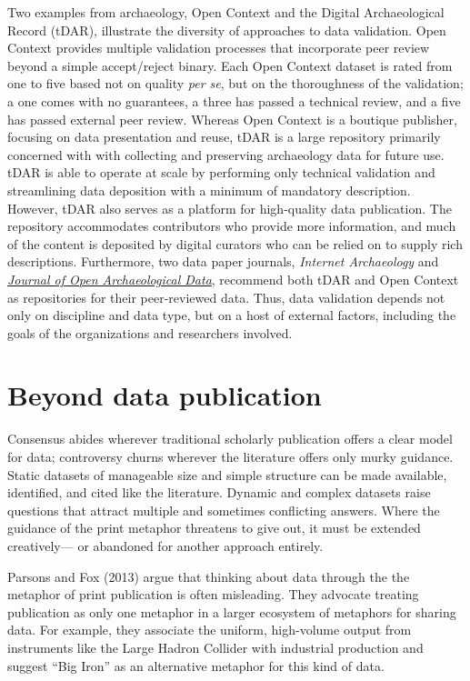 \documentclass[10pt,a4paper,twocolumn]{article}
\begin{document}
{{Two examples from archaeology, Open Context and the Digital Archaeological Record (tDAR), illustrate the diversity of approaches to data validation.
Open Context provides multiple validation processes that incorporate peer review beyond a simple accept/reject binary\cite{kansa_we_2013}.
Each Open Context dataset is rated from one to five based not on quality \emph{per se}, but on the thoroughness of the validation; a one comes with no guarantees, a three has passed a technical review, and a five has passed external peer review.
Whereas Open Context is a boutique publisher, focusing on data presentation and reuse, tDAR is a large repository primarily concerned with with collecting and preserving archaeology data for future use.
tDAR is able to operate at scale by performing only technical validation and streamlining data deposition with a minimum of mandatory description.
However, tDAR also serves as a platform for high-quality data publication.
The repository accommodates contributors who provide more information, and much of the content is deposited by digital curators who can be relied on to supply rich descriptions.
Furthermore, two data paper journals, \emph{Internet Archaeology} and \href{http://openarchaeologydata.metajnl.com/}{\emph{Journal of Open Archaeological Data}}, recommend both tDAR and Open Context as repositories for their peer-reviewed data.
Thus, data validation depends not only on discipline and data type, but on a host of external factors, including the goals of the organizations and researchers involved.


\section*{Beyond data publication}\label{beyond-data-publication}

Consensus abides wherever traditional scholarly publication offers a clear model for data; controversy churns wherever the literature offers only murky guidance.
Static datasets of manageable size and simple structure can be made available, identified, and cited like the literature.
Dynamic and complex datasets raise questions that attract multiple and sometimes conflicting answers.
Where the guidance of the print metaphor threatens to give out, it must be extended creatively--- or abandoned for another approach entirely.

Parsons and Fox (2013)\cite{parsons_is_2013} argue that thinking about data through the the metaphor of print publication is often misleading.
They advocate treating publication as only one metaphor in a larger ecosystem of metaphors for sharing data.
For example, they associate the uniform, high-volume output from instruments like the Large Hadron Collider with industrial production and suggest ``Big Iron'' as an alternative metaphor for this kind of data.

}}
\end{document}
